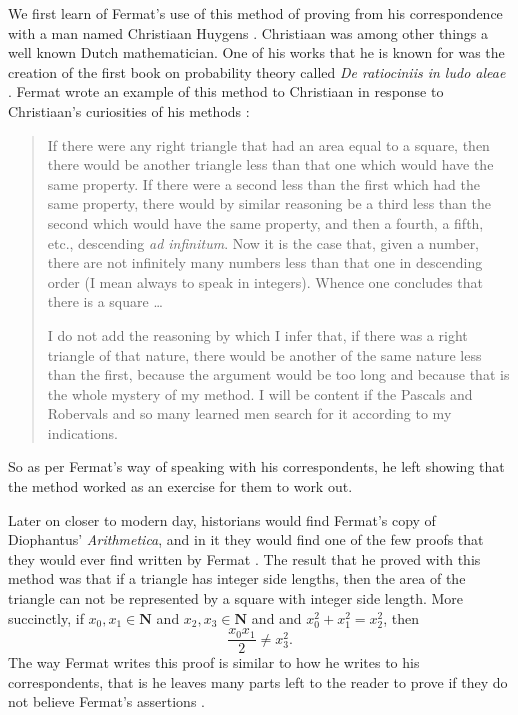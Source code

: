 \documentclass[11pt]{article}
\begin{document}
We first learn of Fermat's use of this method of proving from his correspondence
with a man named Christiaan Huygens \cite{Mahoney, Wirth}.
Christiaan was among other things a well known Dutch mathematician.
One of his works that he is known for was the creation of the first book
on probability theory called \emph{De ratiociniis in ludo aleae} \cite{Huygens}.
Fermat wrote an example of this method to Christiaan in response to Christiaan's
curiosities of his methods \cite{Mahoney}:

\begin{quotation}
    If there were any right triangle that had an area equal to a square,
    then there would be another triangle less than that one which would
    have the same property.
    If there were a second less than the first which had the same property,
    there would by similar reasoning be a third less than the second
    which would have the same property, and then a fourth, a fifth, etc.,
    descending \emph{ad infinitum}.
    Now it is the case that, given a number, there are not infinitely many
    numbers less than that one in descending order (I mean always to speak in
    integers). 
    Whence one concludes that there is a square \ldots

    I do not add the reasoning by which I infer that, if there was a right
    triangle of that nature, there would be another of the same nature less
    than the first, because the argument would be too long and because that is
    the whole mystery of my method.
    I will be content if the Pascals and Robervals and so many learned men
    search for it according to my indications.
\end{quotation}

So as per Fermat's way of speaking with his correspondents, he left showing that
the method worked as an exercise for them to work out.

Later on closer to modern day, historians would find Fermat's copy of 
Diophantus' \emph{Arithmetica}, and in it they would find one of the few proofs
that they would ever find written by Fermat \cite{Wirth}.
The result that he proved with this method was that if a triangle has integer
side lengths, then the area of the triangle can not be represented by a square
with integer side length.
More succinctly, if $x_0,x_1 \in \mathbf{N}$ and $x_2,x_3 \in \mathbf{N}$ and
and $x_0^2 + x_1^2 = x_2^2$, then \[\frac{x_0x_1}{2} \neq x_3^2. \]
The way Fermat writes this proof is similar to how he writes to his correspondents,
that is he leaves many parts left to the reader to prove if they do not believe
Fermat's assertions \cite{Wirth}.
\end{document}

